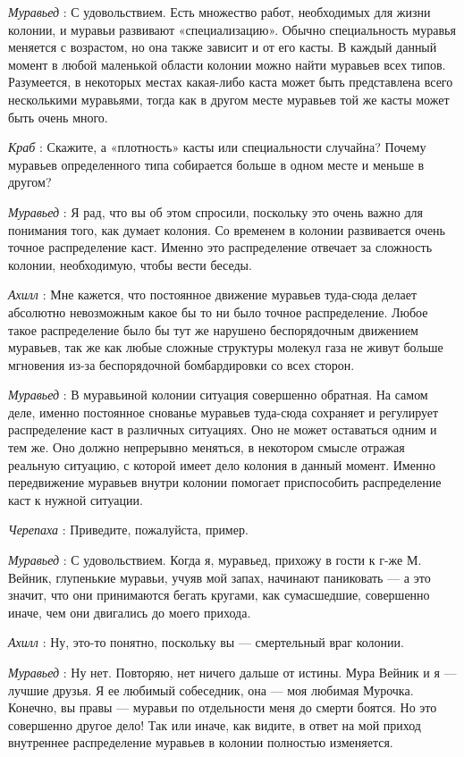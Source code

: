 \documentclass[../main.tex]{subfiles}
\begin{document}
\begin{dialogue}
\emph{Муравьед} : С удовольствием. Есть множество работ, необходимых для жизни колонии, и муравьи развивают «специализацию». Обычно специальность муравья меняется с возрастом, но она также зависит и от его касты. В каждый данный момент в любой маленькой области колонии можно найти муравьев всех типов. Разумеется, в некоторых местах какая-либо каста может быть представлена всего несколькими муравьями, тогда как в другом месте муравьев той же касты может быть очень много.

\emph{Краб} : Скажите, а «плотность» касты или специальности случайна? Почему муравьев определенного типа собирается больше в одном месте и меньше в другом?

\emph{Муравьед} : Я рад, что вы об этом спросили, поскольку это очень важно для понимания того, как думает колония. Со временем в колонии развивается очень точное распределение каст. Именно это распределение отвечает за сложность колонии, необходимую, чтобы вести беседы.

\emph{Ахилл} : Мне кажется, что постоянное движение муравьев туда-сюда делает абсолютно невозможным какое бы то ни было точное распределение. Любое такое распределение было бы тут же нарушено беспорядочным движением муравьев, так же как любые сложные структуры молекул газа не живут больше мгновения из-за беспорядочной бомбардировки со всех сторон.

\emph{Муравьед} : В муравьиной колонии ситуация совершенно обратная. На самом деле, именно постоянное снованье муравьев туда-сюда сохраняет и регулирует распределение каст в различных ситуациях. Оно не может оставаться одним и тем же. Оно должно непрерывно меняться, в некотором смысле отражая реальную ситуацию, с которой имеет дело колония в данный момент. Именно передвижение муравьев внутри колонии помогает приспособить распределение каст к нужной ситуации.

\emph{Черепаха} : Приведите, пожалуйста, пример.

\emph{Муравьед} : С удовольствием. Когда я, муравьед, прихожу в гости к г-же М. Вейник, глупенькие муравьи, учуяв мой запах, начинают паниковать --- а это значит, что они принимаются бегать кругами, как сумасшедшие, совершенно иначе, чем они двигались до моего прихода.

\emph{Ахилл} : Ну, это-то понятно, поскольку вы --- смертельный враг колонии.

\emph{Муравьед} : Ну нет. Повторяю, нет ничего дальше от истины. Мура Вейник и я --- лучшие друзья. Я ее любимый собеседник, она --- моя любимая Мурочка. Конечно, вы правы --- муравьи по отдельности меня до смерти боятся. Но это совершенно другое дело! Так или иначе, как видите, в ответ на мой приход внутреннее распределение муравьев в колонии полностью изменяется.


\end{dialogue}
\end{document}
